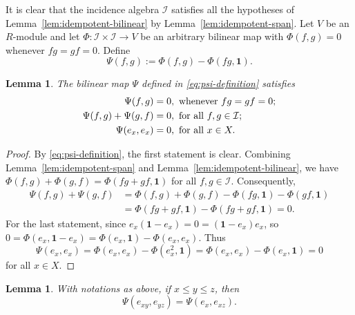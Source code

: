 \documentclass[reqno]{amsart}
\numberwithin{equation}{section}
\theoremstyle{plain}
\newtheorem{lemma}[theorem]{Lemma}
\theoremstyle{definition}
\newcommand{\I}{\mathcal I}
\newcommand{\one}{\mathbf 1}
\begin{document}
It is clear that the incidence algebra $\I$ satisfies all the hypotheses of
Lemma~\ref{lem:idempotent-bilinear} by Lemma~\ref{lem:idempotent-span}.
Let $V$ be an $R$-module and let $\Phi:\I\times\I\to V$ be an arbitrary bilinear map with
$\Phi(f,g)=0$ whenever $fg=gf=0$.
Define
\begin{equation}\label{eq:psi-definition}
\Psi(f,g):=\Phi(f,g)-\Phi(fg,\one).
\end{equation}

\begin{lemma}\label{lem:psi-properties}
The bilinear map $\Psi$ defined in \eqref{eq:psi-definition} satisfies
\begin{align}
\Psi(f,g)&=0,~\text{whenever}~fg=gf=0;\notag\\
\Psi(f,g)+\Psi(g,f)&=0,~\text{for~all}~f,g\in\I;\notag\\
\Psi(e_x,e_x)&=0,~\text{for~all}~x\in X.\notag
\end{align}
\end{lemma}

\begin{proof}
By \eqref{eq:psi-definition}, the first statement is clear.
Combining Lemma~\ref{lem:idempotent-span} and Lemma~\ref{lem:idempotent-bilinear}, we have
$\Phi(f,g)+\Phi(g,f)=\Phi(fg+gf,\one)$ for all $f,g\in \I$.
Consequently,
\[
\begin{aligned}
\Psi(f,g)+\Psi(g,f)
&=\Phi(f,g)+\Phi(g,f)
-\Phi(fg,\one)-\Phi(gf,\one)\\
&=\Phi(fg+gf,\one)-\Phi(fg+gf,\one)=0.
\end{aligned}
\]
For the last statement, since $e_x(\one-e_x)=0=(\one-e_x)e_x$, so
$0=\Phi(e_x,\one-e_x)=\Phi(e_x,\one)-\Phi(e_x,e_x)$.
Thus
\[
\Psi(e_x,e_x)
=\Phi(e_x,e_x)-\Phi(e_x^2,\one)
=\Phi(e_x,e_x)-\Phi(e_x,\one)=0
\]
for all $x\in X$.
\end{proof}

\begin{lemma}\label{lem:psi-chain}
With notations as above, if $x\leq y\leq z$, then
\begin{equation}\label{eq:psi-chain}
\Psi(e_{xy},e_{yz})=\Psi(e_x,e_{xz}).
\end{equation}
\end{lemma}
\end{document}
